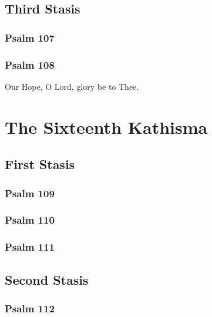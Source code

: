 \documentclass[12pt]{book}
\newcommand{\kathismabreak}{
  \medskip
  \begin{center}
  \begin{footnotesize}
  

  

  

  
  \end{footnotesize}
  \end{center}
  \smallbreak
}
\newcommand{\kathismaend}{
  \medskip
  \begin{center}
  \begin{footnotesize}
  

  

  Our Hope, O Lord, glory be to Thee.
  \end{footnotesize}
  \end{center}
  \smallbreak
}
\begin{document}
\subsection{Third Stasis}

\subsubsection{Psalm 107}


\subsubsection{Psalm 108}


\pagebreak %
\kathismaend

\section{The Sixteenth Kathisma}

\subsection{First Stasis}

\subsubsection{Psalm 109}


\subsubsection{Psalm 110}


\subsubsection{Psalm 111}


\pagebreak %
\kathismabreak

\subsection{Second Stasis}

\subsubsection{Psalm 112}

\end{document}

